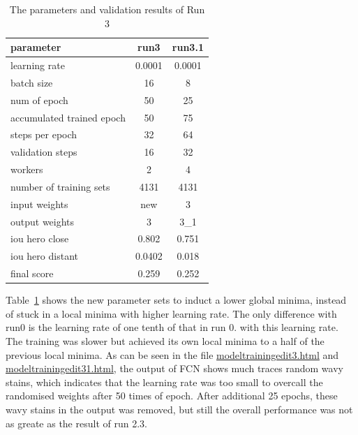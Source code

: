 \documentclass[paper=a4, fontsize=11pt]{scrartcl} %
\numberwithin{equation}{section} %
\numberwithin{figure}{section} %
\numberwithin{table}{section} %
\begin{document}
\begin{table}
	\begin{center}
		\begin{tabular}{ l | c | c }
		\hline
		parameter & run3 & run3.1 \\ \hline
		learning rate & 0.0001 & 0.0001 \\ \hline
		batch size    & 16 & 8 \\ \hline
		num of epoch  & 50 & 25 \\ \hline
		accumulated trained epoch & 50 & 75 \\ \hline
		steps per epoch & 32 & 64 \\ \hline
		validation steps & 16 & 32 \\ \hline
		workers & 2 & 4  \\ \hline
		number of training sets & 4131 & 4131 \\ \hline
		input weights & new & 3 \\ \hline
		output weights & 3 & 3\_1\\ 		
		\hline \hline
		iou hero close &0.802 & 0.751 \\ \hline	  
		iou hero distant & 0.0402 & 0.018 \\ \hline
		final score & 0.259& 0.252 \\
		\hline
		\end{tabular}
		\caption{The parameters and validation results of Run 3}
		\label{tab:parameters3}
	\end{center}
\end{table}

Table~\ref{tab:parameters3} shows the new parameter sets to induct a lower global minima, instead of stuck in a local minima with higher learning rate. The only difference with run0 is the learning rate of one tenth of that in run 0. 
with this learning rate. The training was slower but achieved its own local minima to a half of the previous local minima. As can be seen in the file \href{run:./JupyterNotebooks/modeltrainingedit3.html}{modeltrainingedit3.html} and \href{run:./JupyterNotebooks/modeltrainingedit31.html}{modeltrainingedit31.html}, the output of FCN shows much traces random wavy stains, which indicates that the learning rate was too small to overcall the randomised weights after 50 times of epoch. After additional 25 epochs, these wavy stains in the output was removed, but still the overall performance was not as greate as the result of run 2.3.
\end{document}
